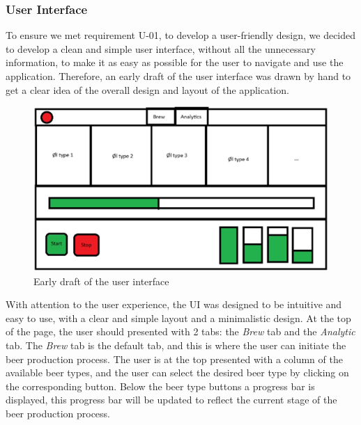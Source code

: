 \subsubsection{User Interface}
To ensure we met requirement U-01, to develop a user-friendly design, we decided to develop a clean and simple user interface, without all the unnecessary information, to make it as easy as possible for the user to navigate and use the application. \newline
Therefore, an early draft of the user interface was drawn by hand to get a clear idea of the overall design and layout of the application. \newline
\begin{center}
  \centering
  \begin{figure}[H]
      \includegraphics[width=1\textwidth]{img/frontend-draft.png}
      \caption{Early draft of the user interface}
      \label{fig:Frontend_draft}
  \end{figure}
\end{center}
With attention to the user experience, the UI was designed to be intuitive and easy to use, with a clear and simple layout and a minimalistic design. \newline
At the top of the page, the user should presented with 2 tabs: the \textit{Brew} tab and the \textit{Analytic} tab.  \newline
The \textit{Brew} tab is the default tab, and this is where the user can initiate the beer production process. \newline
The user is at the top presented with a column of the available beer types, and the user can select the desired beer type by clicking on the corresponding button. \newline
Below the beer type buttons a progress bar is displayed, this progress bar will be updated to reflect the current stage of the beer production process. \newline
